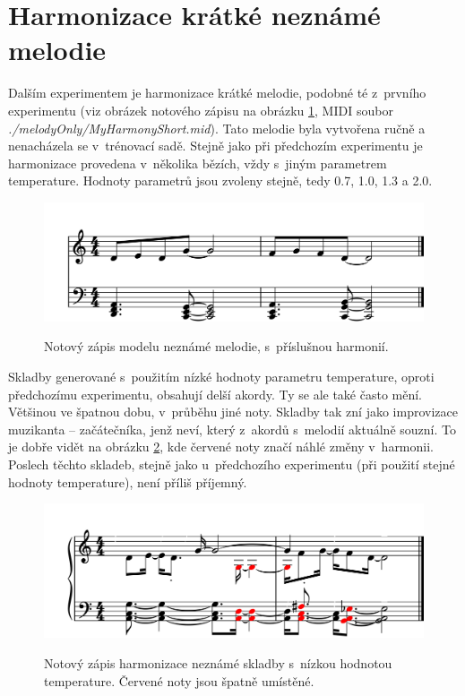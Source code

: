 \section{Harmonizace krátké neznámé melodie}
Dalším experimentem je harmonizace krátké melodie, 
podobné té z~prvního experimentu 
(viz obrázek notového zápisu na obrázku \ref{obrazekMyHarmonyShortNoty}, 
MIDI soubor \emph{./melodyOnly/MyHarmonyShort.mid}).
Tato melodie byla vytvořena ručně 
a nenacházela se v~trénovací sadě.
Stejně jako při předchozím experimentu 
je harmonizace provedena v~několika bězích, 
vždy s~jiným parametrem temperature.
Hodnoty parametrů jsou zvoleny stejně, tedy 0.7, 1.0, 1.3 a 2.0.

\begin{figure}[h]\centering
    \centering
    \includegraphics[width=0.8\linewidth]{obrazky/MyHarmonyShort-1.png}\\[1pt]  
    \caption{Notový zápis modelu neznámé melodie, s~příslušnou harmonií.}    
    \label{obrazekMyHarmonyShortNoty}
\end{figure}
\par

Skladby generované s~použitím nízké hodnoty parametru temperature, 
oproti předchozímu experimentu, obsahují delší akordy.
Ty se ale také často mění.
Většinou ve špatnou dobu, v~průběhu jiné noty.
Skladby tak zní jako improvizace muzikanta -- začátečníka,
jenž neví, který z~akordů s~melodií aktuálně souzní.
To je dobře vidět na obrázku \ref{obrazekMyHarmonyShortNotyLowTemp},
kde červené noty značí náhlé změny v~harmonii.
Poslech těchto skladeb, stejně jako u~předchozího experimentu 
(při použití stejné hodnoty temperature), není příliš příjemný.

\begin{figure}[h]\centering
    \centering
    \includegraphics[width=0.8\linewidth]{obrazky/MyHarmonyShortLowTmp-1.png}\\[1pt]  
    \caption{Notový zápis harmonizace neznámé skladby s~nízkou hodnotou temperature.
    Červené noty jsou špatně umístěné.}    
    \label{obrazekMyHarmonyShortNotyLowTemp}
\end{figure}
\par

